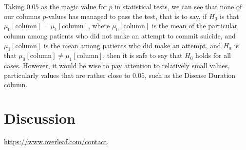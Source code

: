 \documentclass{article}
\begin{document}
Taking $0.05$ as the magic value for $p$ in statistical tests, we can see that none of our columns $p$-values has managed to pass the test, that is to say, if $H_0$ is that $\mu_0[\text{column}]=\mu_1[\text{column}]$, where $\mu_0[\text{column}]$ is the mean of the particular column among patients who did not make an attempt to commit suicide, and $\mu_1[\text{column}]$ is the mean among patients who did make an attempt, and $H_a$ is that $\mu_0[\text{column}]\neq\mu_1[\text{column}]$, then it is safe to say that $H_0$ holds for all cases. However, it would be wise to pay attention to relatively small values, particularly values that are rather close to $0.05$, such as the Disease Duration column.

\section{Discussion}


\url{https://www.overleaf.com/contact}.



\end{document}

